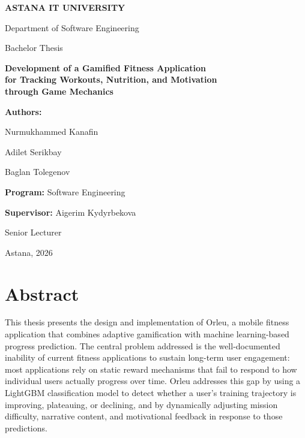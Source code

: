 \documentclass[12pt, a4paper]{report}
\begin{document}
\begin{titlepage}
  \centering
  \vspace*{10mm}
  {\Large\bfseries ASTANA IT UNIVERSITY\par}
  \vspace{4mm}
  {\large Department of Software Engineering\par}
  \vspace{8mm}
  {\large Bachelor Thesis\par}
  \vspace{20mm}
  {\LARGE\bfseries Development of a Gamified Fitness Application\\[6pt]
   for Tracking Workouts, Nutrition, and Motivation\\[6pt]
   through Game Mechanics\par}
  \vspace{20mm}
  \begin{flushleft}
    {\large\textbf{Authors:}}\par
    \vspace{4mm}
    {\large Nurmukhammed Kanafin\par}
    {\large Adilet Serikbay\par}
    {\large Baglan Tolegenov\par}
    \vspace{10mm}
    {\large\textbf{Program:} Software Engineering\par}
    \vspace{10mm}
    {\large\textbf{Supervisor:} Aigerim Kydyrbekova\par}
    {\large Senior Lecturer\par}
  \end{flushleft}
  \vfill
  {\large Astana, 2026\par}
\end{titlepage}

\setcounter{page}{2}

\chapter*{Abstract}

This thesis presents the design and implementation of Orleu, a mobile fitness application that combines adaptive gamification with machine learning-based progress prediction. The central problem addressed is the well-documented inability of current fitness applications to sustain long-term user engagement: most applications rely on static reward mechanisms that fail to respond to how individual users actually progress over time. Orleu addresses this gap by using a LightGBM classification model to detect whether a user's training trajectory is improving, plateauing, or declining, and by dynamically adjusting mission difficulty, narrative content, and motivational feedback in response to those predictions.
\end{document}

